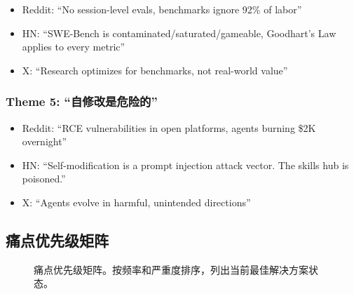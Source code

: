 \begin{itemize}[nosep]
\item Reddit: ``No session-level evals, benchmarks ignore 92\% of labor''
\item HN: ``SWE-Bench is contaminated/saturated/gameable, Goodhart's Law applies to every metric''
\item X: ``Research optimizes for benchmarks, not real-world value''
\end{itemize}

\subsubsection{Theme 5: ``自修改是危险的''}

\begin{itemize}[nosep]
\item Reddit: ``RCE vulnerabilities in open platforms, agents burning \$2K overnight''
\item HN: ``Self-modification is a prompt injection attack vector. The skills hub is poisoned.''
\item X: ``Agents evolve in harmful, unintended directions''
\end{itemize}

\subsection{痛点优先级矩阵}

\begin{figure}[htbp]
\centering
{}
\caption{痛点优先级矩阵。按频率和严重度排序，列出当前最佳解决方案状态。}
\label{fig:ch7-priority}
\end{figure}

